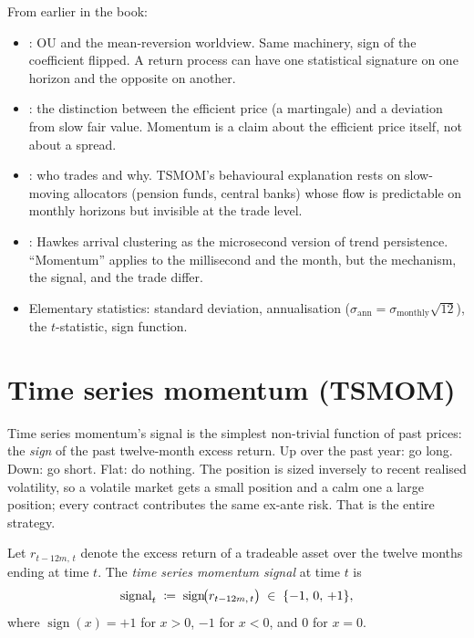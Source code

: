 \begin{backgroundbox}[Prerequisites]
From earlier in the book:
\begin{itemize}
  \item {}: OU and the mean-reversion
  worldview. Same machinery, sign of the coefficient flipped. A
  return process can have one statistical signature on one horizon
  and the opposite on another.
  \item {}: the distinction between the
  efficient price (a martingale) and a deviation from slow fair
  value. Momentum is a claim about the efficient price itself, not
  about a spread.
  \item {}: who trades and why. TSMOM's
  behavioural explanation rests on slow-moving allocators (pension
  funds, central banks) whose flow is predictable on monthly
  horizons but invisible at the trade level.
  \item {}: Hawkes arrival clustering as the
  microsecond version of trend persistence. ``Momentum'' applies
  to the millisecond and the month, but the mechanism, the signal,
  and the trade differ.
  \item Elementary statistics: standard deviation, annualisation
  ($\sigma_{\text{ann}} = \sigma_{\text{monthly}}\sqrt{12}$), the
  $t$-statistic, sign function.
\end{itemize}
\end{backgroundbox}

\section{Time series momentum (TSMOM)}
\label{sec:ch12_tsmom}

Time series momentum's signal is the simplest non-trivial function
of past prices: the \emph{sign} of the past twelve-month excess
return. Up over the past year: go long. Down: go short. Flat: do
nothing. The position is sized inversely to recent realised
volatility, so a volatile market gets a small position and a calm
one a large position; every contract contributes the same ex-ante
risk. That is the entire strategy.

\begin{definition}
\label{def:tsmom_signal}
Let $r_{t-12m,\,t}$ denote the excess return of a tradeable
asset over the twelve months ending at time $t$. The
\emph{time series momentum signal} at time $t$ is
\begin{equation}
  \text{signal}_t \;\coloneqq\; \operatorname{sign}\!\bigl(r_{t-12m,\,t}\bigr)
  \;\in\; \{-1,\,0,\,+1\},
  \label{eq:tsmom_signal}
\end{equation}
where $\operatorname{sign}(x) = +1$ for $x>0$, $-1$ for $x<0$,
and $0$ for $x = 0$.
\end{definition}

